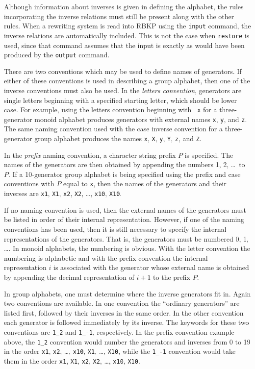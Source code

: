 Although information about inverses is given in defining the alphabet,
the rules incorporating the inverse relations must still be present
along with the other rules.  When a rewriting system is read into RBKP
using the {\tt input} command, the inverse relations are automatically
included.  This is not the case when {\tt restore} is used, since that
command assumes that the input is exactly as would have been produced
by the {\tt output} command.

There are two conventions which may be used to define names of
generators.  If either of these conventions is used in describing a
group alphabet, then one of the inverse conventions must also be used.
In the {\it letters convention\/}, generators are single letters
beginning with a specified starting letter, which should be lower
case.  For example, using the letters convention beginning with {\tt
x} for a three-generator monoid alphabet produces generators with
external names {\tt x}, {\tt y}, and {\tt z}.  The same naming
convention used with the case inverse convention for a three-generator
group alphabet produces the names {\tt x}, {\tt X}, {\tt y}, {\tt Y},
{\tt z}, and {\tt Z}.

In the {\it prefix\/} naming convention, a character string prefix $P$
is specified.  The names of the generators are then obtained by
appending the numbers 1, 2, \dots\ to $P$.  If a 10-generator group
alphabet is being specified using the prefix and case conventions with
$P$ equal to {\tt x}, then the names of the generators and their
inverses are {\tt x1}, {\tt X1}, {\tt x2}, {\tt X2}, \dots, {\tt x10},
{\tt X10}.

If no naming convention is used, then the external names of the
generators must be listed in order of their internal representation.
However, if one of the naming conventions has been used, then it is
still necessary to specify the internal representations of the
generators.  That is, the generators must be numbered 0, 1, \dots.  In
monoid alphabets, the numbering is obvious.  With the letter
convention the numbering is alphabetic and with the prefix convention
the internal representation $i$ is associated with the generator whose
external name is obtained by appending the decimal representation of
$i+1$ to the prefix $P$.

In group alphabets, one must determine where the inverse generators
fit in.  Again two conventions are available.  In one convention the
``ordinary generators'' are listed first, followed by their inverses
in the same order.  In the other convention each generator is followed
immediately by its inverse.  The keywords for these two conventions
are {\tt 1\_2} and {\tt 1\_-1}, respectively.  In the prefix
convention example above, the {\tt 1\_2} convention would number the
generators and inverses from 0 to 19 in the order {\tt x1}, {\tt x2},
\dots, {\tt x10}, {\tt X1}, \dots, {\tt X10}, while the {\tt 1\_-1}
convention would take them in the order {\tt x1}, {\tt X1}, {\tt x2},
{\tt X2}, \dots, {\tt x10}, {\tt X10}.

